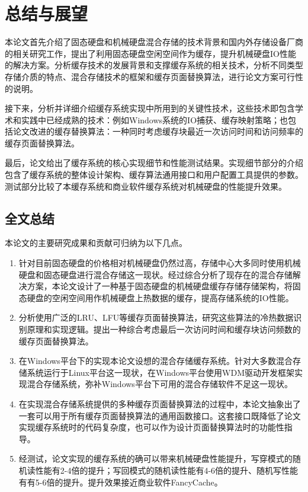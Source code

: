 \chapter{总结与展望}
\label{cha:conclusions}

本论文首先介绍了固态硬盘和机械硬盘混合存储的技术背景和国内外存储设备厂商的相关研究工作，提出了利用固态硬盘空闲空间作为缓存，提升机械硬盘IO性能的解决方案。分析缓存技术的发展背景和支撑缓存系统的相关技术，分析不同类型存储介质的特点、混合存储技术的框架和缓存页面替换算法，进行论文方案可行性的说明。

接下来，分析并详细介绍缓存系统实现中所用到的关键性技术，这些技术即包含学术和实践中已经成熟的技术：例如Windows系统的IO捕获、缓存映射策略；也包括论文改进的缓存替换算法：一种同时考虑缓存块最近一次访问时间和访问频率的缓存页面替换算法。

最后，论文给出了缓存系统的核心实现细节和性能测试结果。实现细节部分的介绍包含了缓存系统的整体设计架构、缓存算法通用接口和用户配置工具提供的参数。测试部分比较了本缓存系统和商业软件缓存系统对机械硬盘的性能提升效果。

\section{全文总结}
\label{sec:thesis_conclusion}
本论文的主要研究成果和贡献可归纳为以下几点。
\begin{enumerate}
\item
针对目前固态硬盘的价格相对机械硬盘仍然过高，存储中心大多同时使用机械硬盘和固态硬盘进行混合存储这一现状。经过综合分析了现存在的混合存储解决方案，本论文设计了一种基于固态硬盘的机械硬盘缓存存储存储架构，将固态硬盘的空闲空间用作机械硬盘上热数据的缓存，提高存储系统的IO性能。
\item
分析使用广泛的LRU、LFU等缓存页面替换算法，研究这些算法的冷热数据识别原理和实现逻辑。提出一种综合考虑最后一次访问时间和缓存块访问频数的缓存页面替换算法。
\item
在Windows平台下的实现本论文设想的混合存储缓存系统。针对大多数混合存储系统运行于Linux平台这一现状，在Windows平台使用WDM驱动开发框架实现混合存储系统，弥补Windows平台下可用的混合存储软件不足这一现状。
\item
在实现混合存储系统提供的多种缓存页面替换算法的过程中，本论文抽象出了一套可以用于所有缓存页面替换算法的通用函数接口。这套接口既降低了论文实现缓存系统时的代码复杂度，也可以作为设计页面替换算法时的功能性指导。
\item
经测试，论文实现的缓存系统的确可以带来机械硬盘性能提升，写穿模式的随机读性能有2-4倍的提升；写回模式的随机读性能有4-6倍的提升、随机写性能有有5-6倍的提升。提升效果接近商业软件FancyCache。
\end{enumerate}

